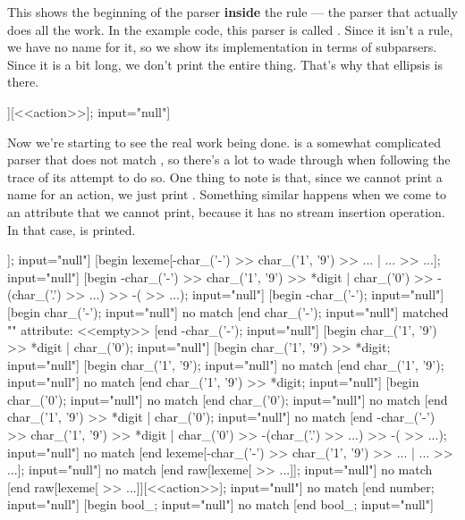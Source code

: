 \documentclass{MyBook}
\begin{document}
\begin{code}
[begin number | bool_ | null | string | ...; input="null"]
\end{code}

This shows the beginning of the parser \textbf{inside} the rule  --- the parser that actually does all the work. In the example code, this parser is called . Since it isn't a rule, we have no name for it, so we show its implementation in terms of subparsers. Since it is a bit long, we don't print the entire thing. That's why that ellipsis is there.

\begin{code}
[begin number; input="null"]
  [begin raw[lexeme[ >> ...]][<<action>>]; input="null"]
\end{code}

Now we're starting to see the real work being done.  is a somewhat complicated parser that does not match , so there's a lot to wade through when following the trace of its attempt to do so. One thing to note is that, since we cannot print a name for an action, we just print . Something similar happens when we come to an attribute that we cannot print, because it has no stream insertion operation. In that case,  is printed.

\begin{code}
    [begin raw[lexeme[ >> ...]]; input="null"]
      [begin lexeme[-char_('-') >> char_('1', '9') >> ... | ... >> ...]; input="null"]
        [begin -char_('-') >> char_('1', '9') >> *digit | char_('0') >> -(char_('.') >> ...) >> -( >> ...); input="null"]
          [begin -char_('-'); input="null"]
            [begin char_('-'); input="null"]
              no match
            [end char_('-'); input="null"]
            matched ""
            attribute: <<empty>>
          [end -char_('-'); input="null"]
          [begin char_('1', '9') >> *digit | char_('0'); input="null"]
            [begin char_('1', '9') >> *digit; input="null"]
              [begin char_('1', '9'); input="null"]
                no match
              [end char_('1', '9'); input="null"]
              no match
            [end char_('1', '9') >> *digit; input="null"]
            [begin char_('0'); input="null"]
              no match
            [end char_('0'); input="null"]
            no match
          [end char_('1', '9') >> *digit | char_('0'); input="null"]
          no match
        [end -char_('-') >> char_('1', '9') >> *digit | char_('0') >> -(char_('.') >> ...) >> -( >> ...); input="null"]
        no match
      [end lexeme[-char_('-') >> char_('1', '9') >> ... | ... >> ...]; input="null"]
      no match
    [end raw[lexeme[ >> ...]]; input="null"]
    no match
  [end raw[lexeme[ >> ...]][<<action>>]; input="null"]
  no match
[end number; input="null"]
[begin bool_; input="null"]
  no match
[end bool_; input="null"]
\end{code}
\end{document}
